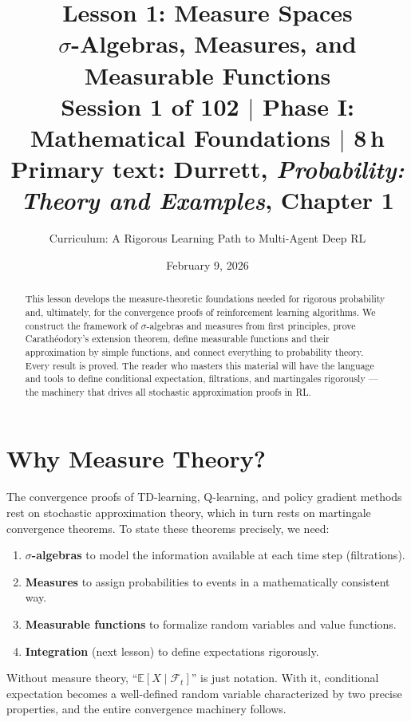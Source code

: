 \documentclass[11pt,a4paper]{article}
\title{\textbf{Lesson 1: Measure Spaces}\\[10pt]
\large $\sigma$-Algebras, Measures, and Measurable Functions\\[5pt]
\normalsize Session 1 of 102 $\mid$ Phase I: Mathematical Foundations $\mid$ 8\,h\\
\normalsize Primary text: Durrett, \emph{Probability: Theory and Examples}, Chapter 1}
\author{Curriculum: A Rigorous Learning Path to Multi-Agent Deep RL}
\date{February 9, 2026}
\theoremstyle{definition}
\theoremstyle{plain}
\theoremstyle{remark}
\newcommand{\E}{\mathbb{E}}
\begin{document}
\maketitle

\begin{abstract}
This lesson develops the measure-theoretic foundations needed for rigorous probability
and, ultimately, for the convergence proofs of reinforcement learning algorithms.
We construct the framework of $\sigma$-algebras and measures from first principles,
prove Carath\'{e}odory's extension theorem, define measurable functions and their
approximation by simple functions, and connect everything to probability theory.
Every result is proved. The reader who masters this material will have the language
and tools to define conditional expectation, filtrations, and martingales rigorously
--- the machinery that drives all stochastic approximation proofs in RL.
\end{abstract}

\tableofcontents
\newpage

\section{Why Measure Theory?}
\label{sec:intro}

The convergence proofs of TD-learning, Q-learning, and policy gradient methods
rest on stochastic approximation theory, which in turn rests on martingale
convergence theorems. To state these theorems precisely, we need:

\begin{enumerate}[nosep]
    \item \textbf{$\sigma$-algebras} to model the information available at each time step (filtrations).
    \item \textbf{Measures} to assign probabilities to events in a mathematically consistent way.
    \item \textbf{Measurable functions} to formalize random variables and value functions.
    \item \textbf{Integration} (next lesson) to define expectations rigorously.
\end{enumerate}

Without measure theory, ``$\E[X \mid \mathcal{F}_t]$'' is just notation. With it,
conditional expectation becomes a well-defined random variable characterized by two
precise properties, and the entire convergence machinery follows.
\end{document}
